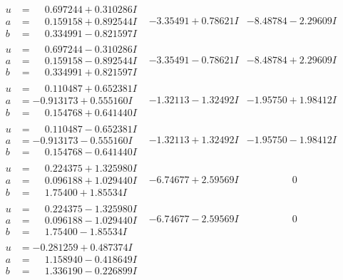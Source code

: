 \documentclass[1p]{elsarticle_modified}
\theoremstyle{definition}
\begin{document}
$$\begin{array}{c|c|c}
\begin{aligned}
u &= \phantom{-}0.697244 + 0.310286 I \\
a &= \phantom{-}0.159158 + 0.892544 I \\
b &= \phantom{-}0.334991 - 0.821597 I\end{aligned}
 & -3.35491 + 0.78621 I & -8.48784 - 2.29609 I \\ \hline\begin{aligned}
u &= \phantom{-}0.697244 - 0.310286 I \\
a &= \phantom{-}0.159158 - 0.892544 I \\
b &= \phantom{-}0.334991 + 0.821597 I\end{aligned}
 & -3.35491 - 0.78621 I & -8.48784 + 2.29609 I \\ \hline\begin{aligned}
u &= \phantom{-}0.110487 + 0.652381 I \\
a &= -0.913173 + 0.555160 I \\
b &= \phantom{-}0.154768 + 0.641440 I\end{aligned}
 & -1.32113 - 1.32492 I & -1.95750 + 1.98412 I \\ \hline\begin{aligned}
u &= \phantom{-}0.110487 - 0.652381 I \\
a &= -0.913173 - 0.555160 I \\
b &= \phantom{-}0.154768 - 0.641440 I\end{aligned}
 & -1.32113 + 1.32492 I & -1.95750 - 1.98412 I \\ \hline\begin{aligned}
u &= \phantom{-}0.224375 + 1.325980 I \\
a &= \phantom{-}0.096188 + 1.029440 I \\
b &= \phantom{-}1.75400 + 1.85534 I\end{aligned}
 & -6.74677 + 2.59569 I & \phantom{-0.000000 } 0 \\ \hline\begin{aligned}
u &= \phantom{-}0.224375 - 1.325980 I \\
a &= \phantom{-}0.096188 - 1.029440 I \\
b &= \phantom{-}1.75400 - 1.85534 I\end{aligned}
 & -6.74677 - 2.59569 I & \phantom{-0.000000 } 0 \\ \hline\begin{aligned}
u &= -0.281259 + 0.487374 I \\
a &= \phantom{-}1.158940 - 0.418649 I \\
b &= \phantom{-}1.336190 - 0.226899 I\end{aligned}

\end{array}$$
\end{document}

